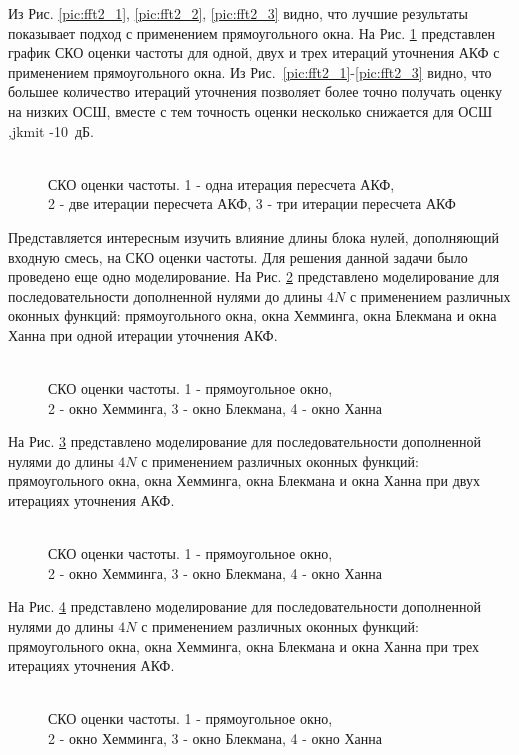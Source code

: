 Из Рис. \ref{pic:fft2_1}, \ref{pic:fft2_2}, \ref{pic:fft2_3} видно, что лучшие результаты показывает подход с применением прямоугольного окна. На Рис. \ref{pic:fft2_rect_1_2_3}
представлен график СКО оценки частоты для одной, двух и трех итераций уточнения АКФ с применением прямоугольного окна. Из \mbox{Рис. \ref{pic:fft2_1}-\ref{pic:fft2_3}}  видно, что большее
количество итераций уточнения позволяет более точно получать оценку на низких ОСШ, вместе с тем точность оценки несколько снижается для ОСШ ,jkmit \mbox{-10 дБ.}
\begin{figure}[h]
	\center{}
	\caption{\\СКО оценки частоты. 1 - одна итерация пересчета АКФ,\\2 - две итерации пересчета АКФ, 3 - три итерации пересчета АКФ}
	\label{pic:fft2_rect_1_2_3}
\end{figure}

Представляется интересным изучить влияние длины блока нулей, дополняющий входную смесь, на СКО оценки частоты. Для решения данной задачи было проведено еще одно моделирование.
На Рис. \ref{pic:fft4_1} представлено моделирование для последовательности дополненной нулями до длины ${4N}$ с применением различных оконных функций:
прямоугольного окна, окна Хемминга, окна Блекмана и окна Ханна при одной итерации уточнения АКФ.
\begin{figure}[h]
	\center{}
	\caption{\\СКО оценки частоты. 1 - прямоугольное окно,\\2 - окно Хемминга, 3 - окно Блекмана, 4 - окно Ханна}
	\label{pic:fft4_1}
\end{figure}

На Рис. \ref{pic:fft4_2} представлено моделирование для последовательности дополненной нулями до длины ${4N}$ с применением различных оконных функций:
прямоугольного окна, окна Хемминга, окна Блекмана и окна Ханна при двух итерациях уточнения АКФ.
\begin{figure}[h]
	\center{}
	\caption{\\СКО оценки частоты. 1 - прямоугольное окно,\\2 - окно Хемминга, 3 - окно Блекмана, 4 - окно Ханна}
	\label{pic:fft4_2}
\end{figure}

На Рис. \ref{pic:fft4_3} представлено моделирование для последовательности дополненной нулями до длины ${4N}$ с применением различных оконных функций:
прямоугольного окна, окна Хемминга, окна Блекмана и окна Ханна при трех итерациях уточнения АКФ.
\begin{figure}[h]
	\center{}
	\caption{\\СКО оценки частоты. 1 - прямоугольное окно,\\2 - окно Хемминга, 3 - окно Блекмана, 4 - окно Ханна}
	\label{pic:fft4_3}
\end{figure}

